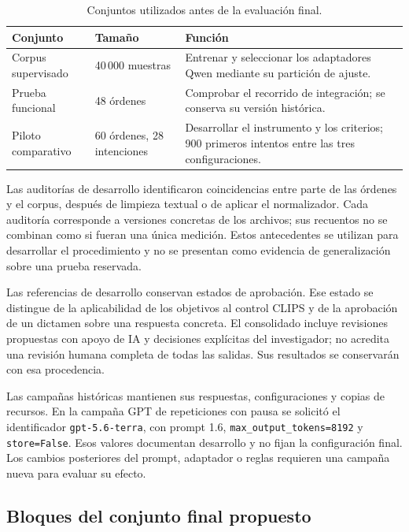 \begin{table}[htbp]
\centering
\small
\caption{Conjuntos utilizados antes de la evaluación final.}
\label{tab:desarrollo_cap6}
\begin{tabularx}{\textwidth}{@{}p{}p{}X@{}}
\toprule
\textbf{Conjunto} & \textbf{Tamaño} & \textbf{Función} \\
\midrule
Corpus supervisado & 40\,000 muestras & Entrenar y seleccionar los adaptadores Qwen mediante su partición de ajuste. \\
Prueba funcional & 48 órdenes & Comprobar el recorrido de integración; se conserva su versión histórica. \\
Piloto comparativo & 60 órdenes, 28 intenciones & Desarrollar el instrumento y los criterios; 900 primeros intentos entre las tres configuraciones. \\
\bottomrule
\end{tabularx}
\end{table}

Las auditorías de desarrollo identificaron coincidencias entre parte de
las órdenes y el corpus, después de limpieza textual o de aplicar el
normalizador. Cada auditoría corresponde a versiones concretas de los
archivos; sus recuentos no se combinan como si fueran una única medición.
Estos antecedentes se utilizan para desarrollar el procedimiento y no
se presentan como evidencia de generalización sobre una prueba reservada.

Las referencias de desarrollo conservan estados de aprobación. Ese estado
se distingue de la aplicabilidad de los objetivos al control CLIPS y de
la aprobación de un dictamen sobre una respuesta concreta. El consolidado
incluye revisiones propuestas con apoyo de IA y decisiones explícitas del
investigador; no acredita una revisión humana completa de todas las salidas.
Sus resultados se conservarán con esa procedencia.

Las campañas históricas mantienen sus respuestas, configuraciones y
copias de recursos. En la campaña GPT de repeticiones con pausa se
solicitó el identificador \texttt{gpt-5.6-terra}, con prompt 1.6,
\texttt{max\_output\_tokens=8192} y \texttt{store=False}.
Esos valores documentan desarrollo y no fijan la configuración final.
Los cambios posteriores del prompt, adaptador o reglas requieren una
campaña nueva para evaluar su efecto.

\subsection{Bloques del conjunto final propuesto}

